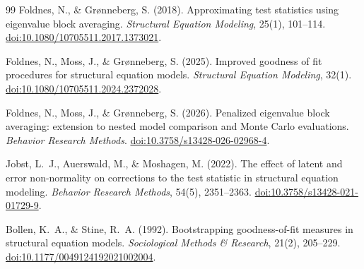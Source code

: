 \documentclass[11pt]{article}
\theoremstyle{plain}
\theoremstyle{remark}
\begin{document}
\begin{thebibliography}{99}
 Foldnes, N., \& Gr\o nneberg, S. (2018).
Approximating test statistics using eigenvalue block averaging. \emph{Structural
Equation Modeling}, 25(1), 101--114.
\href{https://doi.org/10.1080/10705511.2017.1373021}{doi:10.1080/10705511.2017.1373021}.

 Foldnes, N., Moss, J., \& Gr\o nneberg, S.
(2025). Improved goodness of fit procedures for structural equation models.
\emph{Structural Equation Modeling}, 32(1).
\href{https://doi.org/10.1080/10705511.2024.2372028}{doi:10.1080/10705511.2024.2372028}.

 Foldnes, N., Moss, J., \& Gr\o nneberg, S.
(2026). Penalized eigenvalue block averaging: extension to nested model comparison
and Monte Carlo evaluations. \emph{Behavior Research Methods}.
\href{https://doi.org/10.3758/s13428-026-02968-4}{doi:10.3758/s13428-026-02968-4}.

 Jobst, L.~J., Auerswald, M., \& Moshagen, M.
(2022). The effect of latent and error non-normality on corrections to the test
statistic in structural equation modeling. \emph{Behavior Research Methods},
54(5), 2351--2363.
\href{https://doi.org/10.3758/s13428-021-01729-9}{doi:10.3758/s13428-021-01729-9}.

 Bollen, K.~A., \& Stine, R.~A. (1992). Bootstrapping
goodness-of-fit measures in structural equation models. \emph{Sociological Methods
\& Research}, 21(2), 205--229.
\href{https://doi.org/10.1177/0049124192021002004}{doi:10.1177/0049124192021002004}.

\end{thebibliography}
\end{document}
